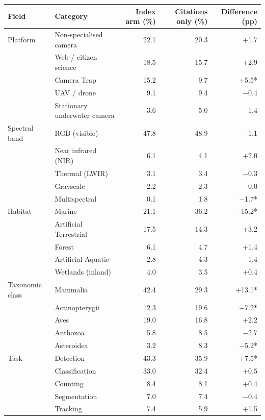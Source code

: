 \begin{tabular}{llrrr}
\toprule
\textbf{Field} & \textbf{Category} & \textbf{Index arm (\%)} & \textbf{Citations only (\%)} & \textbf{Difference (pp)} \\
\midrule
Platform & Non-specialised camera & 22.1 & 20.3 & +1.7 \\
 & Web / citizen science & 18.5 & 15.7 & +2.9 \\
 & Camera Trap & 15.2 & 9.7 & +5.5* \\
 & UAV / drone & 9.1 & 9.4 & $-$0.4 \\
 & Stationary underwater camera & 3.6 & 5.0 & $-$1.4 \\
\addlinespace
Spectral band & RGB (visible) & 47.8 & 48.9 & $-$1.1 \\
 & Near infrared (NIR) & 6.1 & 4.1 & +2.0 \\
 & Thermal (LWIR) & 3.1 & 3.4 & $-$0.3 \\
 & Grayscale & 2.2 & 2.3 & 0.0 \\
 & Multispectral & 0.1 & 1.8 & $-$1.7* \\
\addlinespace
Habitat & Marine & 21.1 & 36.2 & $-$15.2* \\
 & Artificial Terrestrial & 17.5 & 14.3 & +3.2 \\
 & Forest & 6.1 & 4.7 & +1.4 \\
 & Artificial Aquatic & 2.8 & 4.3 & $-$1.4 \\
 & Wetlands (inland) & 4.0 & 3.5 & +0.4 \\
\addlinespace
Taxonomic class & Mammalia & 42.4 & 29.3 & +13.1* \\
 & Actinopterygii & 12.3 & 19.6 & $-$7.2* \\
 & Aves & 19.0 & 16.8 & +2.2 \\
 & Anthozoa & 5.8 & 8.5 & $-$2.7 \\
 & Asteroidea & 3.2 & 8.3 & $-$5.2* \\
\addlinespace
Task & Detection & 43.3 & 35.9 & +7.5* \\
 & Classification & 33.0 & 32.4 & +0.5 \\
 & Counting & 8.4 & 8.1 & +0.4 \\
 & Segmentation & 7.0 & 7.4 & $-$0.4 \\
 & Tracking & 7.4 & 5.9 & +1.5 \\
\bottomrule
\end{tabular}
